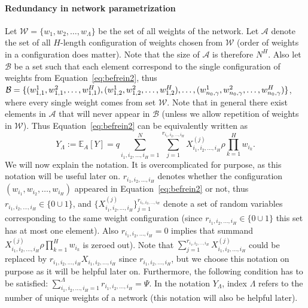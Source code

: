 \documentclass[twoside]{article}
\begin{document}
\paragraph{Redundancy in network parametrization}
Let $\mathcal{W} = \{w_1,w_2,\dots,w_{\Lambda}\}$ be the set of all weights of the network. Let $\mathcal{A}$ denote the set of all $H$-length configuration of weights chosen from $\mathcal{W}$ (order of weights in a configuration does matter). Note that the size of $\mathcal{A}$ is therefore $N^H$. Also let $\mathcal{B}$ be a set such that each element correspond to the single configuration of weights from Equation~\ref{eq:befrein2}, thus $\mathcal{B} = \{(w_{1,1}^1,w_{1,1}^2,\dots,w_{1,1}^H),(w_{1,2}^1,w_{1,2}^2,\dots,w_{1,2}^H),\dots,\\(w_{n_0,\gamma}^1,w_{n_0,\gamma}^2,\dots,w_{n_0,\gamma}^H)\}$, where every single weight comes from set $\mathcal{W}$. Note that in general there exist elements in $\mathcal{A}$ that will never appear in $\mathcal{B}$ (unless we allow repetition of weights in $\mathcal{W}$). Thus Equation~\ref{eq:befrein2} can be equivalently written as 
\begin{equation}
Y_{\Lambda} \!:=\! \mathbb{E}_A[Y] \!=\! q\!\!\!\!\sum_{i_1,i_2,\dots,i_H=1}^{N}\!\!\!\!\!\!\!\sum_{j = 1}^{r_{i_1\!,i_2,\dots,i_H}}\!\!\!\!\!X_{i_1,i_2,\dots,i_H}^{(j)}\rho\!\prod_{k = 1}^{H}\!\!w_{i_k}.
\label{eq:befapprox}
\end{equation}
We will now explain the notation. It is overcomplicated for purpose, as this notation will be useful later on. $r_{i_1,i_2,\dots,i_H}$ denotes whether the configuration $(w_{i_1},w_{i_2},\dots,w_{i_H})$ appeared in Equation~\ref{eq:befrein2} or not, thus $r_{i_1,i_2,\dots,i_H} \in \{0\cup{1}\}$, and $\{X_{i_1,i_2,\dots,i_H}^{(j)}\}_{j=1}^{r_{i_1,i_2,\dots,i_H}}$ denote a set of random variables corresponding to the same weight configuration (since $r_{i_1,i_2,\dots,i_H} \in \{0\cup{1}\}$ this set has at most one element). Also $r_{i_1,i_2,\dots,i_H} = 0$ implies that summand $X_{i_1,i_2,\dots,i_H}^{(j)}\rho\prod_{k = 1}^{H}w_{i_k}$ is zeroed out). Note that $\sum_{j = 1}^{r_{i_1\!,i_2,\dots,i_H}}X_{i_1,i_2,\dots,i_H}^{(j)}$ could be replaced by $r_{i_1\!,i_2,\dots,i_H}X_{i_1,i_2,\dots,i_H}$ since $r_{i_1,i_2,\dots,i_H}$, but we choose this notation on purpose as it will be helpful later on. Furthermore, the following condition has to be satisfied: $\sum_{i_1,i_2,\dots,i_H=1}^{\Lambda}r_{i_1,i_2,\dots,i_H} = \Psi$. In the notation $Y_{\Lambda}$, index $\Lambda$ refers to the number of unique weights of a network (this notation will also be helpful later).  
\end{document}
